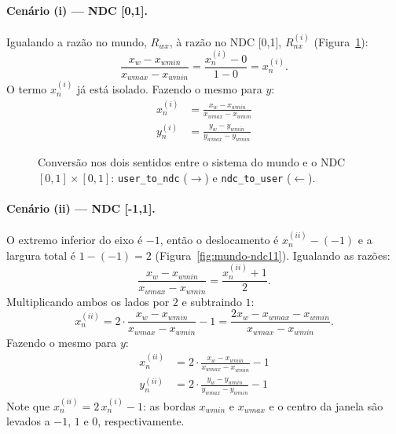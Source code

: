 \paragraph{Cenário (i) --- NDC [0,1].} Igualando a razão no mundo, $R_{wx}$, à razão no NDC [0,1], $R_{nx}^{(i)}$ (Figura~\ref{fig:mundo-ndc01}):
\[
    \frac{x_w - x_{wmin}}{x_{wmax} - x_{wmin}} = \frac{x_n^{(i)} - 0}{1 - 0} = x_n^{(i)}.
\]
O termo $x_n^{(i)}$ já está isolado. Fazendo o mesmo para $y$:
\begin{equation}
    \boxed{\begin{aligned}
        x_n^{(i)} &= \frac{x_w - x_{wmin}}{x_{wmax} - x_{wmin}} \\[2mm]
        y_n^{(i)} &= \frac{y_w - y_{wmin}}{y_{wmax} - y_{wmin}}
    \end{aligned}}
    \label{eq:user-ndc-i}
\end{equation}

\begin{figure}[H]
    \centering
    \mapafig{\presetmundo}{\presetndci}
    \caption{Conversão nos dois sentidos entre o sistema do mundo e o NDC $[0,1] \times [0,1]$: \texttt{user\_to\_ndc} ($\rightarrow$) e \texttt{ndc\_to\_user} ($\leftarrow$).}
    \label{fig:mundo-ndc01}
\end{figure}

\paragraph{Cenário (ii) --- NDC [-1,1].} O extremo inferior do eixo é $-1$, então o deslocamento é $x_n^{(ii)} - (-1)$ e a largura total é $1 - (-1) = 2$ (Figura~\ref{fig:mundo-ndc11}). Igualando as razões:
\[
    \frac{x_w - x_{wmin}}{x_{wmax} - x_{wmin}} = \frac{x_n^{(ii)} + 1}{2}.
\]
Multiplicando ambos os lados por $2$ e subtraindo $1$:
\[
    x_n^{(ii)} = 2 \cdot \frac{x_w - x_{wmin}}{x_{wmax} - x_{wmin}} - 1
    = \frac{2x_w - x_{wmax} - x_{wmin}}{x_{wmax} - x_{wmin}}.
\]
Fazendo o mesmo para $y$:
\begin{equation}
    \boxed{\begin{aligned}
        x_n^{(ii)} &= 2 \cdot \frac{x_w - x_{wmin}}{x_{wmax} - x_{wmin}} - 1 \\[2mm]
        y_n^{(ii)} &= 2 \cdot \frac{y_w - y_{wmin}}{y_{wmax} - y_{wmin}} - 1
    \end{aligned}}
    \label{eq:user-ndc-ii}
\end{equation}
Note que $x_n^{(ii)} = 2\,x_n^{(i)} - 1$: as bordas $x_{wmin}$ e $x_{wmax}$ e o centro da janela são levados a $-1$, $1$ e $0$, respectivamente.

